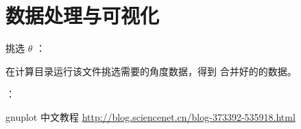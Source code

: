 \section{数据处理与可视化}

挑选 $\theta$ ：


在计算目录运行该文件挑选需要的角度数据，得到 合并好的的数据。


：


gnuplot 中文教程 \url{http://blog.sciencenet.cn/blog-373392-535918.html}

